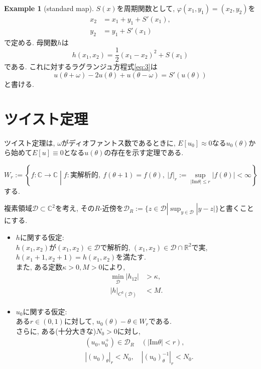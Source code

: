 \documentclass[a4paper]{ujarticle}
\numberwithin{equation}{section}
\theoremstyle{definition}
\newtheorem{example}{Example}
\begin{document}
        \begin{example}[standard map]
            $S(x)$を周期関数として, $\varphi(x_1, y_1) = (x_2, y_2)$を
            \begin{align}
                x_2 &= x_1 + y_1 + S'(x_1), \\
                y_2 &= y_1 + S'(x_1)
            \end{align}
            で定める. 母関数$h$は
            \[
                h(x_1, x_2) = \frac{1}{2}(x_1 - x_2)^2 + S(x_1)
            \]
            である. これに対するラグランジュ方程式\eqref{eq:3}は
            \[
                u(\theta + \omega) - 2 u(\theta) + u(\theta - \omega) = S'(u(\theta))
            \]
            と書ける.
        \end{example}

    \section{ツイスト定理}

        ツイスト定理は, $\omega$がディオファントス数であるときに,
        $E[u_0] \approx 0$なる$u_0(\theta)$から始めて$E[u] \equiv 0$となる$u(\theta)$の存在を示す定理である.
        
        \[
            W_r := \left\{f: \mathbb{C} \rightarrow \mathbb{C} \middle| f : \text{実解析的}, \ f(\theta + 1) = f(\theta), \ |f|_r := \sup_{|\mathrm{Im} \theta| \leq r} |f(\theta)| < \infty \right\}
        \]
        する.

        複素領域$\mathcal{D} \subset \mathbb{C}^2$を考え, その$R$-近傍を$\mathcal{D}_{R} := \{z \in \mathcal{D} | \sup_{y \in \mathcal{D}}|y - z| \}$と書くことにする.
        \begin{itemize}
            \item $h$に関する仮定: \\
            $h(x_1, x_2)$が$(x_1, x_2) \in \mathcal{D}$で解析的, $(x_1, x_2) \in \mathcal{D} \cap \mathbb{R}^2$で実, 
            $h(x_1 + 1, x_2 + 1) = h(x_1, x_2)$を満たす. \\
            また, ある定数$\kappa > 0, M > 0$により, 
            \begin{align}
                \min_{\mathcal{D}} |h_{12}| &> \kappa, \label{eq:5} \\
                |h|_{C^3(\mathcal{D})} &< M. \label{eq:6}
            \end{align}
            \item $u_0$に関する仮定: \\
            ある$r \in (0, 1)$に対して, $u_0(\theta) - \theta \in W_r$である. \\
            さらに, ある(十分大きな)$N_0 > 0$に対し, 
            \begin{align}
                &(u_0, u^{+}_0) \in \mathcal{D}_{R} \quad (|\mathrm{Im} \theta| < r), \\
                &|(u_0)_{\theta}|_r < N_0, \quad |(u_0)^{-1}_{\theta}|_r < N_0.
            \end{align}
        \end{itemize}
\end{document}
